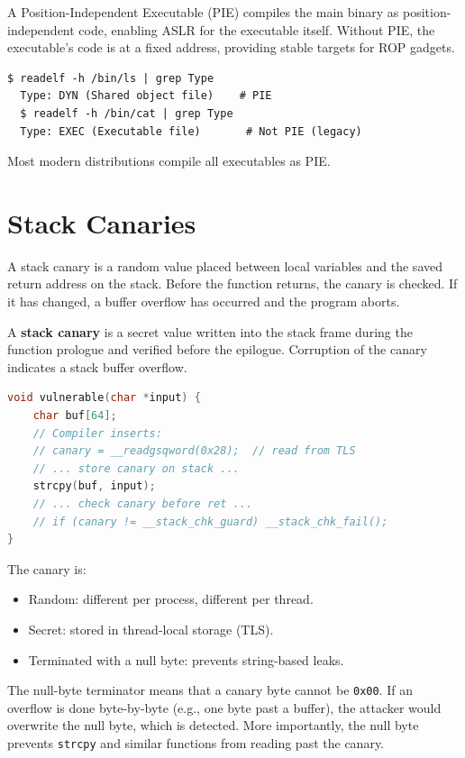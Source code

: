 A Position-Independent Executable (PIE) compiles the main binary as position-independent code, enabling ASLR for the executable itself. Without PIE, the executable's code is at a fixed address, providing stable targets for ROP gadgets.

\begin{lstlisting}[caption=Checking if a binary is PIE]
  $ readelf -h /bin/ls | grep Type
  Type: DYN (Shared object file)    # PIE
  $ readelf -h /bin/cat | grep Type
  Type: EXEC (Executable file)       # Not PIE (legacy)
\end{lstlisting}

Most modern distributions compile all executables as PIE.

\section{Stack Canaries}

A stack canary is a random value placed between local variables and the saved return address on the stack. Before the function returns, the canary is checked. If it has changed, a buffer overflow has occurred and the program aborts.

\begin{definition}
	A \textbf{stack canary} is a secret value written into the stack frame during the function prologue and verified before the epilogue. Corruption of the canary indicates a stack buffer overflow.
\end{definition}

\begin{lstlisting}[language=C, caption=Canary-protected stack frame]
void vulnerable(char *input) {
    char buf[64];
    // Compiler inserts:
    // canary = __readgsqword(0x28);  // read from TLS
    // ... store canary on stack ...
    strcpy(buf, input);
    // ... check canary before ret ...
    // if (canary != __stack_chk_guard) __stack_chk_fail();
}
\end{lstlisting}

The canary is:
\begin{itemize}
	\item Random: different per process, different per thread.
	\item Secret: stored in thread-local storage (TLS).
	\item Terminated with a null byte: prevents string-based leaks.
\end{itemize}

The null-byte terminator means that a canary byte cannot be \texttt{0x00}. If an overflow is done byte-by-byte (e.g., one byte past a buffer), the attacker would overwrite the null byte, which is detected. More importantly, the null byte prevents \texttt{strcpy} and similar functions from reading past the canary.

